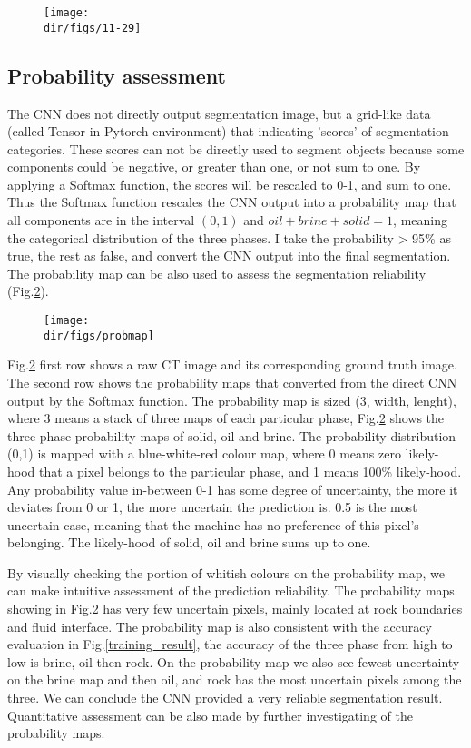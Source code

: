 \begin{figure}[htbp]
  \centering
  \texttt{[image: \\dir/figs/11-29]}
  \caption{}
  \label{11-29}
\end{figure}

\subsection{Probability assessment}
The CNN does not directly output segmentation image, but a grid-like data (called Tensor in Pytorch environment) that indicating 'scores' of segmentation categories. These scores can not be directly used to segment objects because some components could be negative, or greater than one, or not sum to one. By applying a Softmax function, the scores will be rescaled to 0-1, and sum to one. Thus the Softmax function rescales the CNN output into a probability map that all components are in the interval $(0,1)$ and $oil+brine+solid=1$, meaning the categorical distribution of the three phases. I take the probability > 95\% as true, the rest as false, and convert the CNN output into the final segmentation. The probability map can be also used to assess the segmentation reliability (Fig.\ref{probmap}).

\begin{figure}[htbp]
  \centering
  \texttt{[image: \\dir/figs/probmap]}
  \caption{}
  \label{probmap}
\end{figure}

Fig.\ref{probmap} first row shows a raw CT image and its corresponding ground truth image. The second row shows the probability maps that converted from the direct CNN output by the Softmax function. The probability map is sized (3, width, lenght), where 3 means a stack of three maps of each particular phase, Fig.\ref{probmap} shows the three phase probability maps of solid, oil and brine. The probability distribution (0,1) is mapped with a blue-white-red colour map, where 0 means zero likely-hood that a pixel belongs to the particular phase, and 1 means 100\% likely-hood. Any probability value in-between 0-1 has some degree of uncertainty, the more it deviates from 0 or 1, the more uncertain the prediction is. 0.5 is the most uncertain case, meaning that the machine has no preference of this pixel's belonging. The likely-hood of solid, oil and brine sums up to one.

By visually checking the portion of whitish colours on the probability map, we can make intuitive assessment of the prediction reliability. The probability maps showing in Fig.\ref{probmap} has very few uncertain pixels, mainly located at rock boundaries and fluid interface. The probability map is also consistent with the accuracy evaluation in Fig.\ref{training_result}, the accuracy of the three phase from high to low is brine, oil then rock. On the probability map we also see fewest uncertainty on the brine map and then oil, and rock has the most uncertain pixels among the three. We can conclude the CNN provided a very reliable segmentation result. Quantitative assessment can be also made by further investigating of the probability maps.

